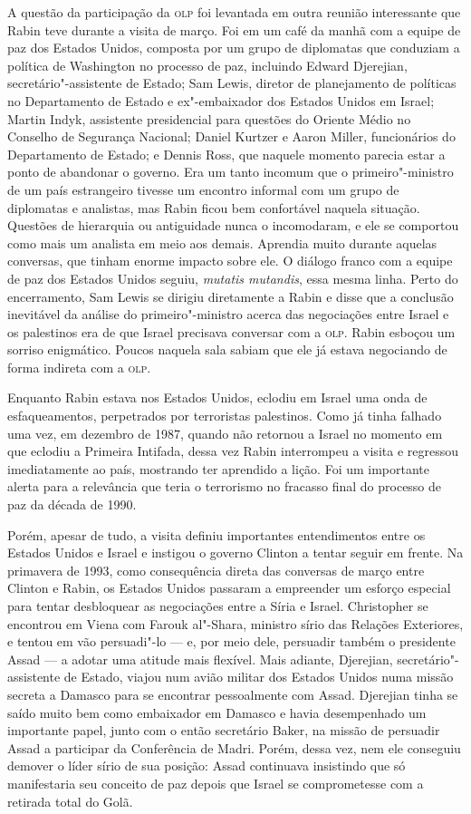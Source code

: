 A questão da participação da \textsc{olp} foi levantada em outra reunião
interessante que Rabin teve durante a visita de março. Foi em um café da
manhã com a equipe de paz dos Estados Unidos, composta por um grupo de
diplomatas que conduziam a política de Washington no processo de paz,
incluindo Edward Djerejian, secretário"-assistente de Estado; Sam Lewis,
diretor de planejamento de políticas no Departamento de Estado e
ex"-embaixador dos Estados Unidos em Israel; Martin Indyk, assistente
presidencial para questões do Oriente Médio no Conselho de Segurança
Nacional; Daniel Kurtzer e Aaron Miller, funcionários do Departamento de
Estado; e Dennis Ross, que naquele momento parecia estar a ponto de
abandonar o governo. Era um tanto incomum que o primeiro"-ministro de um
país estrangeiro tivesse um encontro informal com um grupo de diplomatas
e analistas, mas Rabin ficou bem confortável naquela situação. Questões
de hierarquia ou antiguidade nunca o incomodaram, e ele se comportou
como mais um analista em meio aos demais. Aprendia muito durante aquelas
conversas, que tinham enorme impacto sobre ele. O diálogo franco com a
equipe de paz dos Estados Unidos seguiu, \emph{mutatis mutandis}, essa
mesma linha. Perto do encerramento, Sam Lewis se dirigiu diretamente a
Rabin e disse que a conclusão inevitável da análise do primeiro"-ministro
acerca das negociações entre Israel e os palestinos era de que Israel
precisava conversar com a \textsc{olp}. Rabin esboçou um sorriso enigmático.
Poucos naquela sala sabiam que ele já estava negociando de forma
indireta com a \textsc{olp}.

Enquanto Rabin estava nos Estados Unidos, eclodiu em Israel uma onda de
esfaqueamentos, perpetrados por terroristas palestinos. Como já tinha
falhado uma vez, em dezembro de 1987, quando não retornou a Israel no
momento em que eclodiu a Primeira Intifada, dessa vez Rabin interrompeu
a visita e regressou imediatamente ao país, mostrando ter aprendido a
lição. Foi um importante alerta para a relevância que teria o terrorismo
no fracasso final do processo de paz da década de 1990.

Porém, apesar de tudo, a visita definiu importantes entendimentos entre
os Estados Unidos e Israel e instigou o governo Clinton a tentar seguir
em frente. Na primavera de 1993, como consequência direta das conversas
de março entre Clinton e Rabin, os Estados Unidos passaram a empreender
um esforço especial para tentar desbloquear as negociações entre a Síria
e Israel. Christopher se encontrou em Viena com Farouk al"-Shara,
ministro sírio das Relações Exteriores, e tentou em vão persuadi"-lo ---
e, por meio dele, persuadir também o presidente Assad --- a adotar uma
atitude mais flexível. Mais adiante, Djerejian, secretário"-assistente de Estado,
viajou num avião militar dos Estados Unidos numa missão
secreta a Damasco para se encontrar pessoalmente com Assad. Djerejian
tinha se saído muito bem como embaixador em Damasco e havia desempenhado
um importante papel, junto com o então secretário Baker, na missão de
persuadir Assad a participar da Conferência de Madri. Porém, dessa vez,
nem ele conseguiu demover o líder sírio de sua posição: Assad continuava
insistindo que só manifestaria seu conceito de paz depois que Israel se
comprometesse com a retirada total do Golã.

